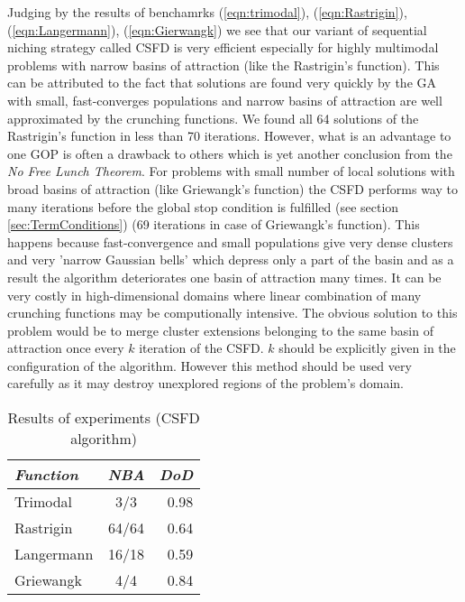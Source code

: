 Judging by the results of benchamrks (\ref{eqn:trimodal}),
(\ref{eqn:Rastrigin}), (\ref{eqn:Langermann}), (\ref{eqn:Gierwangk})
we see that our variant of sequential niching strategy called CSFD
is very efficient especially for highly multimodal problems with 
narrow basins of attraction (like the Rastrigin's function). This can
be attributed to the fact that solutions are found very quickly by the GA with
small, fast-converges populations and narrow basins of attraction are well
approximated by the crunching functions. We found all 64 solutions of the
Rastrigin's function in less than 70 iterations. However, what is an
advantage to one GOP is often a drawback to others which is
yet another conclusion from the \textit{No Free Lunch Theorem}.
For problems with small number of local solutions with broad basins of
attraction (like Griewangk's function) the CSFD performs way to many 
iterations before the global stop condition is fulfilled (see section
\ref{sec:TermConditions}) (69 iterations in case of Griewangk's function).
This happens because fast-convergence and small populations give very dense 
clusters and very 'narrow Gaussian bells' which depress only a part of the basin
and as a result the algorithm deteriorates one basin of attraction many times.
It can be very costly in high-dimensional domains where linear combination of 
many crunching functions may be computionally intensive.
The obvious solution to this problem would be to merge cluster extensions
belonging to the same basin of attraction once every $k$ iteration of the 
CSFD. $k$ should be explicitly given in the configuration of the
algorithm. However this method should be used very carefully as it may
destroy unexplored regions of the problem's domain.



\begin{table}
\begin{center}
\caption{Results of experiments (CSFD algorithm)}
\begin{tabular}{| l | c | r |}
\hline
\label{tab:resultsCsfd}
\textit{Function} & \textit{NBA} & \textit{DoD} \\ \hline \hline
Trimodal & 3/3 & 0.98 \\ \hline
Rastrigin & 64/64 & 0.64 \\ \hline
Langermann & 16/18 & 0.59 \\ \hline
Griewangk & 4/4 & 0.84 \\ \hline
\end{tabular}
\end{center}
\end{table}

